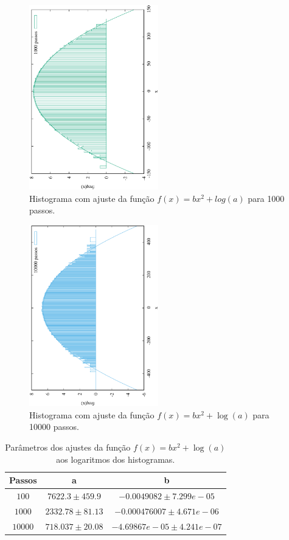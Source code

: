 \documentclass[brazilian, 12pt, a4paper, final]{article}
\begin{document}
\begin{figure}[htbp]
  \centering
  \includegraphics[width=0.5\textwidth,angle=-90]{Q3/log1000.eps}
  \caption{Histograma com ajuste da função $f(x)=bx^2+log(a)$ para 1000 passos.}
\end{figure}      
  
\begin{figure}[htbp]
  \centering
  \includegraphics[width=0.5\textwidth,angle=-90]{Q3/log10000.eps}
  \caption{Histograma com ajuste da função $f(x)=bx^2+\log(a)$ para 10000 passos.}
\end{figure} 

	\begin{table}[hptb]
    \centering
    \begin{tabular}{c|c|c}
	 Passos  	&	a	&	b	 \\ 
    \hline
    $100$	&	$7622.3\pm459.9$	&	$-0.0049082\pm7.299e-05$\\ 
    $1000$	&	$2332.78\pm81.13$	&	$-0.000476007\pm4.671e-06$\\ 
    $10000$	&	$718.037\pm20.08$	&	$-4.69867e-05\pm4.241e-07$\\ 
    \end{tabular}
    \caption{Parâmetros dos ajustes da função $f(x)=bx^2+\log(a)$ aos logaritmos dos histogramas.}
\end{table}
	
\end{document}
